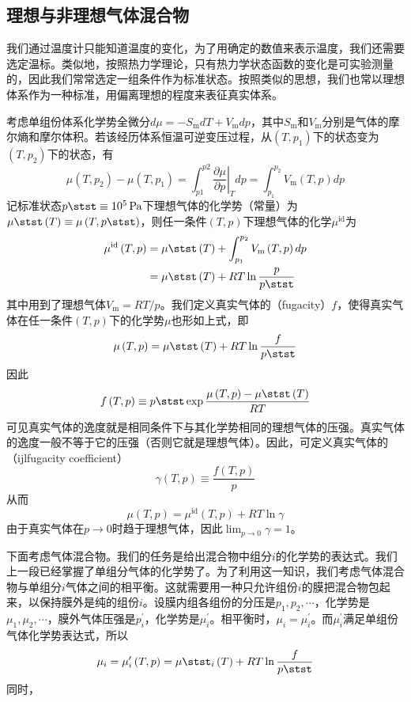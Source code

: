 \documentclass[main.tex]{subfiles}
\begin{document}
\subsection{理想与非理想气体混合物}
我们通过温度计只能知道温度的变化，为了用确定的数值来表示温度，我们还需要选定温标。类似地，按照热力学理论，只有热力学状态函数的变化是可实验测量的，因此我们常常选定一组条件作为标准状态。按照类似的思想，我们也常以理想体系作为一种标准，用偏离理想的程度来表征真实体系。

考虑单组份体系化学势全微分$d\mu=-S_\mathrm{m}dT+V_\mathrm{m}dp$，其中$S_\mathrm{m}$和$V_\mathrm{m}$分别是气体的摩尔熵和摩尔体积。若该经历体系恒温可逆变压过程，从$\left(T,p_1\right)$下的状态变为$\left(T,p_2\right)$下的状态，有
\[
\mu\left(T,p_2\right)-\mu\left(T,p_1\right)=\int_{p1}^{p2}\left.\frac{\partial\mu}{\partial p}\right|_Tdp=\int_{p_1}^{p_2}V_\mathrm{m}\left(T,p\right)dp\]
记标准状态$p\stst\equiv\qty{e5}{\pascal}$下理想气体的化学势（常量）为$\mu\stst\left(T\right)\equiv\mu\left(T,p\stst\right)$，则任一条件$\left(T,p\right)$下理想气体的化学$\mu^\mathrm{id}$为
\begin{align*}
\mu^\mathrm{id}\left(T,p\right)&=\mu\stst\left(T\right)+\int_{p_1}^{p_2}V_\mathrm{m}\left(T,p\right)dp\\
&=\mu\stst\left(T\right)+RT\ln\frac{p}{p\stst}
\end{align*}
其中用到了理想气体$V_\mathrm{m}=RT/p$。我们定义真实气体的（fugacity）$f$，使得真实气体在任一条件$\left(T,p\right)$下的化学势$\mu$也形如上式，即
\[\mu\left(T,p\right)=\mu\stst\left(T\right)+RT\ln\frac{f}{p\stst}\]
因此
\[f\left(T,p\right)\equiv p\stst\exp\frac{\mu\left(T,p\right)-\mu\stst\left(T\right)}{RT}\]
可见真实气体的逸度就是相同条件下与其化学势相同的理想气体的压强。真实气体的逸度一般不等于它的压强（否则它就是理想气体）。因此，可定义真实气体的（ijlfugacity coefficient）
\[\gamma\left(T,p\right)\equiv\frac{f\left(T,p\right)}{p}\]
从而
\[\mu\left(T,p\right)=\mu^\mathrm{id}\left(T,p\right)+RT\ln\gamma\]
由于真实气体在$p\rightarrow 0$时趋于理想气体，因此$\lim_{p\to 0}\gamma=1$。

下面考虑气体混合物。我们的任务是给出混合物中组分$i$的化学势的表达式。我们上一段已经掌握了单组分气体的化学势了。为了利用这一知识，我们考虑气体混合物与单组分$i$气体之间的相平衡。这就需要用一种只允许组份$i$的膜把混合物包起来，以保持膜外是纯的组份$i$。设膜内组各组份的分压是$p_1,p_2,\cdots$，化学势是$\mu_1,\mu_2,\cdots$，膜外气体压强是$p^\prime_i$，化学势是$\mu^\prime_i$。相平衡时，$\mu_i=\mu^\prime_i$。而$\mu^\prime_i$满足单组份气体化学势表达式，所以
\[\mu_i=\mu^\prime_i\left(T,p\right)=\mu\stst_i\left(T\right)+RT\ln\frac{f}{p\stst}\]
同时，
\end{document}
